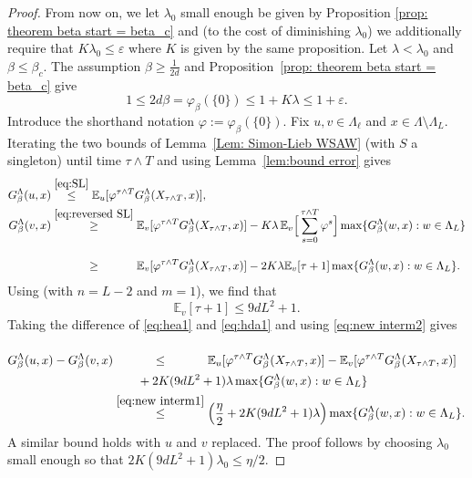 \documentclass[11pt,a4paper]{article}
\numberwithin{equation}{section}
\theoremstyle{plain}
\theoremstyle{definition}
\begin{document}
\begin{proof}
From now on, we let $\lambda_0$ small enough be given by Proposition \ref{prop: theorem beta start = beta_c} and (to the cost of diminishing $\lambda_0$) we additionally require that $K\lambda_0\le \varepsilon$ where $K$ is given by the same proposition. Let $\lambda<\lambda_0$ and $\beta\le\beta_c$. The assumption $\beta\ge \tfrac1{2d}$ and Proposition~\ref{prop:  theorem beta start = beta_c} give
\begin{equation}
1\le 2d\beta=\varphi_\beta(\{0\})\le 1+K\lambda\le 1+\varepsilon.
\end{equation}
Introduce the shorthand notation $\varphi:=\varphi_\beta(\{0\})$. Fix $u,v\in \Lambda_\ell$ and $x\in \Lambda\setminus \Lambda_L$.
Iterating the two bounds of Lemma~\ref{Lem: Simon-Lieb WSAW} (with $S$ a singleton) until time $\tau\wedge T$ and using Lemma~\ref{lem:bound error} gives
\begin{align}
G_\beta^\Lambda(u,x)&\stackrel{\eqref{eq:SL}}\le  \mathbb E_{u}[\varphi^{\tau\wedge T} G_\beta^\Lambda(X_{\tau\wedge T},x)],\label{eq:hea1}\\
G_\beta^\Lambda(v,x)&\stackrel{\eqref{eq:reversed SL}}\ge \mathbb E_{v}[\varphi^{\tau\wedge T} G_\beta^\Lambda(X_{\tau\wedge T},x)]-K\lambda \,\mathbb E_v\Big[\sum_{s=0}^{\tau\wedge T}\varphi^s\Big]\max\{G_\beta^\Lambda(w,x):w\in \Lambda_{L}\}\\
&\stackrel{\phantom{\eqref{eq:reversed SL}}}\ge \mathbb E_v[\varphi^{\tau\wedge T} G_\beta^\Lambda(X_{\tau\wedge T},x)]-2K\lambda \mathbb E_v[\tau+1]\max\{G_\beta^\Lambda(w,x):w\in \Lambda_{L}\}\label{eq:hda1}.
\end{align}
Using \cite[Proposition~A.5]{DumPan24Perco} (with $n=L-2$ and $m=1$), we find that
\begin{equation}\label{eq:new interm2}
	\mathbb E_v[\tau+1]\leq 9dL^2+1.
\end{equation}
Taking the difference of \eqref{eq:hea1} and \eqref{eq:hda1} and using \eqref{eq:new interm2} gives
\begin{align}\notag
	G_\beta^{\Lambda}(u,x)-G_\beta^{\Lambda}(v,x)&\stackrel{\phantom{\eqref{eq:new interm1}}}\leq \mathbb E_{u}[\varphi^{\tau\wedge T} G_\beta^\Lambda(X_{\tau\wedge T},x)]-\mathbb E_{v}[\varphi^{\tau\wedge T} G_\beta^\Lambda(X_{\tau\wedge T},x)] \notag
	\\&\qquad +2K(9dL^2+1)\lambda \max\{G_\beta^\Lambda(w,x):w\in \Lambda_{L}\}
	\\&\stackrel{\eqref{eq:new interm1}}\leq \Big(\frac{\eta}{2} +2K(9dL^2+1)\lambda \Big)\max\{G_\beta^\Lambda(w,x):w\in \Lambda_{L}\}.
\end{align}
A similar bound holds with $u$ and $v$ replaced.
The proof follows by choosing $\lambda_0$ small enough so that $2K(9dL^2+1)\lambda_0\leq \eta/2$.
\end{proof}
\end{document}
